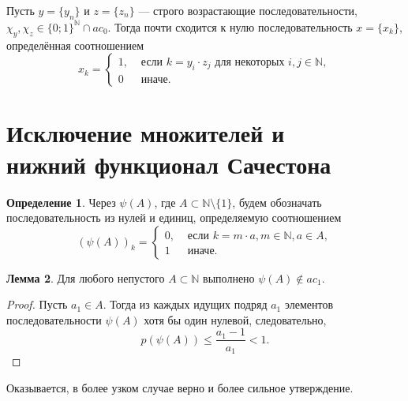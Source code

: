 \documentclass[a4paper,openbib]{article}
\renewcommand{\leq}{\leqslant}
\theoremstyle{definition}
\newtheorem{lemma}{Лемма}[section]
\newtheorem{definition}[lemma]{Определение}
\begin{document}
\begin{hypothesis}
	Пусть $y=\{y_n\}$ и $z=\{z_n\}$ --- строго возрастающие последовательности,
	$\chi_y,\chi_z\in\{0;1\}^\mathbb{N} \cap ac_0$.
	Тогда почти сходится к нулю последовательность $x=\{x_k\}$, определённая соотношением
	\begin{equation}
		x_k = \begin{cases}
			1, &\mbox{~если~} k = y_i \cdot z_j \mbox{~для некоторых~} i,j\in\mathbb{N},
			\\
			0  &\mbox{~иначе}
			.
		\end{cases}
	\end{equation}
\end{hypothesis}


\section{Исключение множителей и \\  нижний функционал Сачестона}



\begin{definition}
	Через $\psi(A)$, где $A\subset\mathbb{N}\setminus\{1\}$,
	будем обозначать последовательность из нулей и единиц,
	определяемую соотношением
	\begin{equation}
		(\psi(A))_k = \begin{cases}
			0, & \mbox{~если~} k = m\cdot a, m \in \mathbb{N}, a\in A,
			\\
			1  & \mbox{~иначе.}
		\end{cases}
	\end{equation}
\end{definition}



\begin{lemma}
	Для любого непустого $A\subset \mathbb{N} $ выполнено $\psi(A) \notin ac_1$.
\end{lemma}
\begin{proof}
	Пусть $a_1\in A$.
	Тогда из каждых идущих подряд $a_1$ элементов последовательности $\psi(A)$
	хотя бы один нулевой,
	следовательно,
	\begin{equation}
		p(\psi(A)) \leq \frac{a_1-1}{a_1} < 1
		.
	\end{equation}
\end{proof}

Оказывается, в более узком случае верно и более сильное утверждение.
\end{document}
